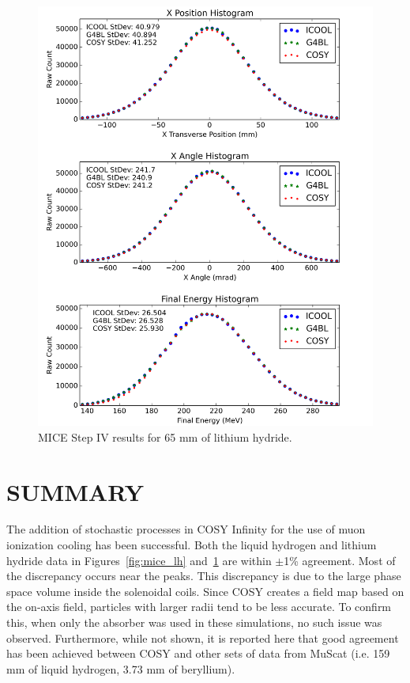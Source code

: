 \documentclass[a4paper,11pt]{article}
\begin{document}
\begin{figure}[!htb]
  \centering
    \includegraphics[width=0.7\columnwidth]{MICE_LiH} 
  \caption{MICE Step IV results for 65 mm of lithium hydride.}
  \label{fig:mice_lih}
\end{figure}

\section{SUMMARY}
The addition of stochastic processes in COSY Infinity for the use of muon ionization cooling has been successful. Both the liquid hydrogen and lithium hydride data in Figures~\ref{fig:mice_lh} and~\ref{fig:mice_lih} are within $\pm$1\% agreement. Most of the discrepancy occurs near the peaks. This discrepancy is due to the large phase space volume inside the solenoidal coils. Since COSY creates a field map based on the on-axis field, particles with larger radii tend to be less accurate. To confirm this, when only the absorber was used in these simulations, no such issue was observed. Furthermore, while not shown, it is reported here that good agreement has been achieved between COSY and other sets of data from MuScat \cite{Muscat} (i.e. 159 mm of liquid hydrogen, 3.73 mm of beryllium).


\end{document}
